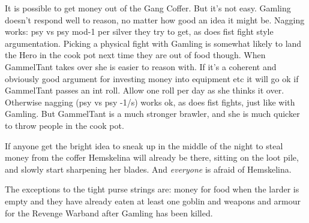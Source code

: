 %

It is possible to get money out of the Gang Coffer. But it's not easy. Gamling doesn't respond well to reason, no matter how good an idea it might be. Nagging works: psy vs psy mod-1 per silver they try to get, as does fist fight style argumentation. Picking a physical fight with Gamling is somewhat likely to land the Hero in the cook pot next time they are out of food though. When GammelTant takes over she is easier to reason with. If it's a coherent and obviously good argument for investing money into equipment etc it will go ok if GammelTant passes an int roll. Allow one roll per day as she thinks it over. Otherwise nagging (psy vs psy -1/s) works ok, as does fist fights, just like with Gamling. But GammelTant is a much stronger brawler, and she is much quicker to throw people in the cook pot.

If anyone get the bright idea to sneak up in the middle of the night to steal money from the coffer Hemskelina will already be there, sitting on the loot pile, and slowly start sharpening her blades. And \emph{everyone} is afraid of Hemskelina.

The exceptions to the tight purse strings are: money for food when the larder is empty and they have already eaten at least one goblin and weapons and armour for the Revenge Warband after Gamling has been killed.







